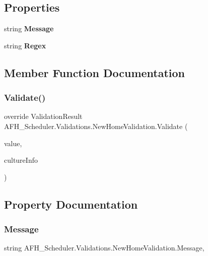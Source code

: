 \subsection*{Properties}
\begin{DoxyCompactItemize}
\item 
string \textbf{ Message}\hspace{0.3cm}{\ttfamily  [get, set]}
\item 
string \textbf{ Regex}\hspace{0.3cm}{\ttfamily  [get, set]}
\end{DoxyCompactItemize}


\subsection{Member Function Documentation}
\mbox{\label{class_a_f_h___scheduler_1_1_validations_1_1_new_home_validation_a2d3b9c9abf3f1a79f5309aae7b21fcd9}} 
\subsubsection{Validate()}
{\footnotesize\ttfamily override Validation\+Result A\+F\+H\+\_\+\+Scheduler.\+Validations.\+New\+Home\+Validation.\+Validate (\begin{DoxyParamCaption}\item[{object}]{value,  }\item[{Culture\+Info}]{culture\+Info }\end{DoxyParamCaption})}



\subsection{Property Documentation}
\mbox{\label{class_a_f_h___scheduler_1_1_validations_1_1_new_home_validation_a5f6c02f4e050f15cafbee9376feea439}} 
\subsubsection{Message}
{\footnotesize\ttfamily string A\+F\+H\+\_\+\+Scheduler.\+Validations.\+New\+Home\+Validation.\+Message\hspace{0.3cm}{\ttfamily [get]}, {\ttfamily [set]}}

